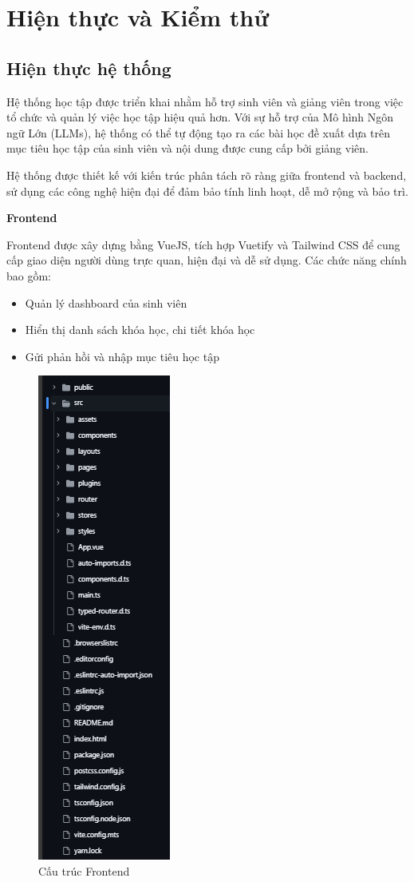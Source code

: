 \chapter{Hiện thực và Kiểm thử}

\section{Hiện thực hệ thống}
Hệ thống học tập được triển khai nhằm hỗ trợ sinh viên và giảng viên trong việc tổ chức và quản lý việc học tập hiệu quả hơn. Với sự hỗ trợ của Mô hình Ngôn ngữ Lớn (LLMs), hệ thống có thể tự động tạo ra các bài học đề xuất dựa trên mục tiêu học tập của sinh viên và nội dung được cung cấp bởi giảng viên.

Hệ thống được thiết kế với kiến trúc phân tách rõ ràng giữa frontend và backend, sử dụng các công nghệ hiện đại để đảm bảo tính linh hoạt, dễ mở rộng và bảo trì.

\textbf{Frontend} 

Frontend được xây dựng bằng VueJS, tích hợp Vuetify và Tailwind CSS để cung cấp giao diện người dùng trực quan, hiện đại và dễ sử dụng. Các chức năng chính bao gồm:

\begin{itemize}
    \item Quản lý dashboard của sinh viên
    \item Hiển thị danh sách khóa học, chi tiết khóa học
    \item Gửi phản hồi và nhập mục tiêu học tập
\end{itemize}

\begin{figure}[H]
    \centering
    \includegraphics[scale=0.5]{Images/Implement/frontendStructure.png}
    \caption{Cấu trúc Frontend}
\end{figure}


